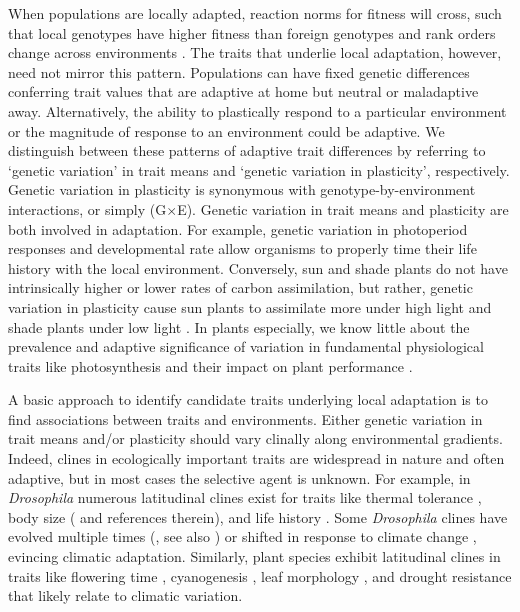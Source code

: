 \documentclass[11pt, oneside]{article}
\begin{document}
When populations are locally adapted, reaction norms for fitness will cross, such that local genotypes have higher fitness than foreign genotypes and rank orders change across environments \citep{Kawecki_Ebert_2004}. The traits that underlie local adaptation, however, need not mirror this pattern. Populations can have fixed genetic differences conferring trait values that are adaptive at home but neutral or maladaptive away. Alternatively, the ability to plastically respond to a particular environment or the magnitude of response to an environment could be adaptive. We distinguish between these patterns of adaptive trait differences by referring to `genetic variation' in trait means and `genetic variation in plasticity', respectively. Genetic variation in plasticity is synonymous with genotype-by-environment interactions, or simply (G$\times$E). Genetic variation in trait means and plasticity are both involved in adaptation. For example, genetic variation in photoperiod responses \citep{Blackman_etal_2011} and developmental rate \citep{Stinchcombe_etal_2004} allow organisms to properly time their life history with the local environment. Conversely, sun and shade plants do not have intrinsically higher or lower rates of carbon assimilation, but rather, genetic variation in plasticity cause sun plants to assimilate more under high light and shade plants under low light \citep{Givnish_1988}. In plants especially, we know little about the prevalence and adaptive significance of variation in fundamental physiological traits like photosynthesis and their impact on plant performance \citep{Flood_etal_2011}.

A basic approach to identify candidate traits underlying local adaptation is to find associations between traits and environments. Either genetic variation in trait means and/or plasticity should vary clinally along environmental gradients. Indeed, clines in ecologically important traits are widespread in nature \citep{Endler_1977} and often adaptive, but in most cases the selective agent is unknown. For example, in \textit{Drosophila} numerous latitudinal clines exist for traits like thermal tolerance \citep{Hoffmann_etal_2002}, body size (\cite{Coyne_Beecham_1987} and references therein), and life history \citep{Schmidt_etal_2005}. Some \textit{Drosophila} clines have evolved multiple times (\cite{Oakeshott_etal_1982, Huey_etal_2000}, see also \cite{Bradshaw_Holzapfel_2001}) or shifted in response to climate change \citep{Umina_etal_2005}, evincing climatic adaptation. Similarly, plant species exhibit latitudinal clines in traits like flowering time \citep{Stinchcombe_etal_2004}, cyanogenesis \citep{Kooyers_Olsen_2012}, leaf morphology \citep{Hopkins_etal_2008, Stock_etal_2014}, and drought resistance \citep{Kooyers_etal_2015} that likely relate to climatic variation. 
\end{document}
